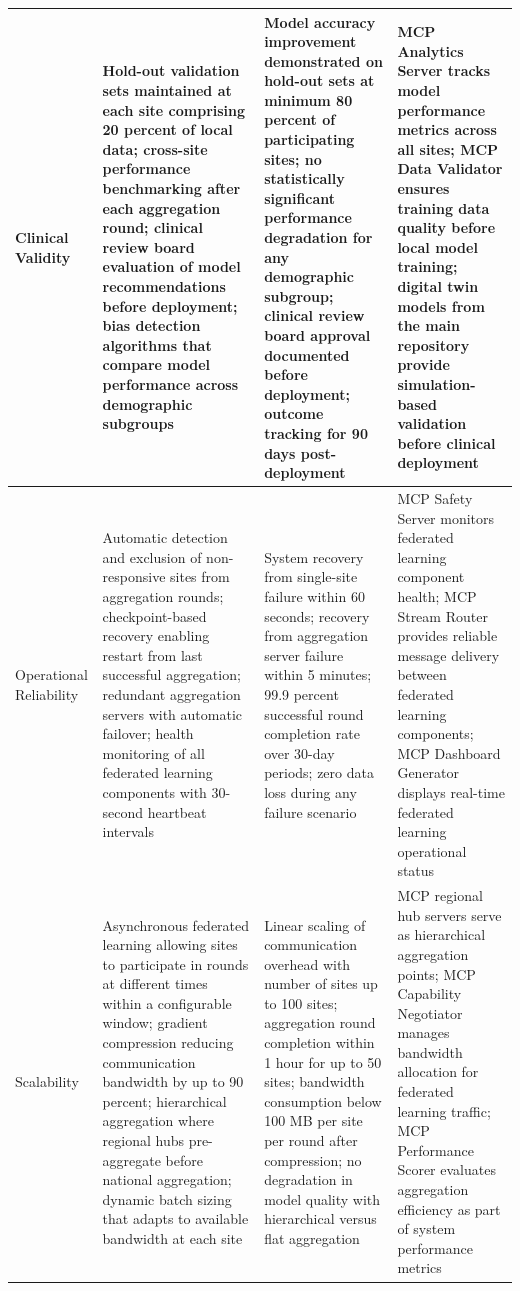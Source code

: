 \begin{longtable}{l p{3.5cm} p{3.5cm} p{3.5cm}}
Clinical Validity & Hold-out validation sets maintained at each site comprising 20 percent of local data; cross-site performance benchmarking after each aggregation round; clinical review board evaluation of model recommendations before deployment; bias detection algorithms that compare model performance across demographic subgroups & Model accuracy improvement demonstrated on hold-out sets at minimum 80 percent of participating sites; no statistically significant performance degradation for any demographic subgroup; clinical review board approval documented before deployment; outcome tracking for 90 days post-deployment & MCP Analytics Server tracks model performance metrics across all sites; MCP Data Validator ensures training data quality before local model training; digital twin models from the main repository \cite{main-repo} provide simulation-based validation before clinical deployment \\
\midrule
Operational Reliability & Automatic detection and exclusion of non-responsive sites from aggregation rounds; checkpoint-based recovery enabling restart from last successful aggregation; redundant aggregation servers with automatic failover; health monitoring of all federated learning components with 30-second heartbeat intervals & System recovery from single-site failure within 60 seconds; recovery from aggregation server failure within 5 minutes; 99.9 percent successful round completion rate over 30-day periods; zero data loss during any failure scenario & MCP Safety Server monitors federated learning component health; MCP Stream Router provides reliable message delivery between federated learning components; MCP Dashboard Generator displays real-time federated learning operational status \\
\midrule
Scalability & Asynchronous federated learning allowing sites to participate in rounds at different times within a configurable window; gradient compression reducing communication bandwidth by up to 90 percent; hierarchical aggregation where regional hubs pre-aggregate before national aggregation; dynamic batch sizing that adapts to available bandwidth at each site & Linear scaling of communication overhead with number of sites up to 100 sites; aggregation round completion within 1 hour for up to 50 sites; bandwidth consumption below 100 MB per site per round after compression; no degradation in model quality with hierarchical versus flat aggregation & MCP regional hub servers serve as hierarchical aggregation points; MCP Capability Negotiator manages bandwidth allocation for federated learning traffic; MCP Performance Scorer evaluates aggregation efficiency as part of system performance metrics \\
\end{longtable}

